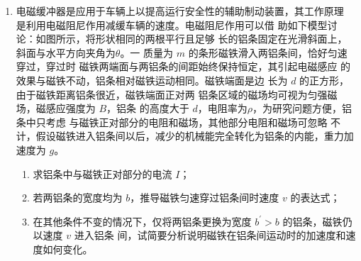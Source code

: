 \begin{enumerate}
\item 
{}
电磁缓冲器是应用于车辆上以提高运行安全性的辅助制动装置，其工作原理
是利用电磁阻尼作用减缓车辆的速度。电磁阻尼作用可以借
助如下模型讨论：如图所示，将形状相同的两根平行且足够
长的铝条固定在光滑斜面上，斜面与水平方向夹角为$ \theta $。一
质量为 $ m $ 的条形磁铁滑入两铝条间，恰好匀速穿过，穿过时
磁铁两端面与两铝条的间距始终保持恒定，其引起电磁感应
的效果与磁铁不动，铝条相对磁铁运动相同。磁铁端面是边
长为 $ d $ 的正方形，由于磁铁距离铝条很近，磁铁端面正对两
铝条区域的磁场均可视为匀强磁场，磁感应强度为 $ B $，铝条
的高度大于 $ d $，电阻率为$ \rho $，为研究问题方便，铝条中只考虑
与磁铁正对部分的电阻和磁场，其他部分电阻和磁场可忽略
不计，假设磁铁进入铝条间以后，减少的机械能完全转化为铝条的内能，重力加速度为 $ g $。
\begin{enumerate}
\item
求铝条中与磁铁正对部分的电流 $ I $；
\item 
若两铝条的宽度均为 $ b $，推导磁铁匀速穿过铝条间时速度 $ v $ 的表达式；
\item 
在其他条件不变的情况下，仅将两铝条更换为宽度 $ b ^{\prime} >b $ 的铝条，磁铁仍以速度 $ v $ 进入铝条
间，试简要分析说明磁铁在铝条间运动时的加速度和速度如何变化。


\end{enumerate}
\begin{figure}[h!]
\flushright

\end{figure}





\end{enumerate}
